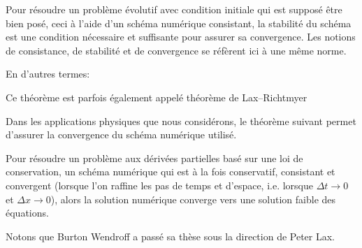 \begin{theoreme}
Pour résoudre un problème évolutif avec condition initiale qui est supposé être bien posé, ceci à l'aide d'un schéma numérique consistant, la stabilité du schéma est une condition nécessaire et suffisante pour assurer sa convergence.
Les notions de consistance, de stabilité et de convergence se réfèrent ici à une même norme.

En d'autres termes: 
\end{theoreme}
Ce théorème est parfois également appelé théorème de Lax–Richtmyer

\medskip
Dans les applications physiques que nous considérons, le théorème suivant permet d'assurer la convergence du schéma numérique utilisé.
\begin{theoreme}
Pour résoudre un problème aux dérivées partielles basé sur une loi de conservation, un schéma numérique qui est à la fois conservatif, consistant et convergent (lorsque l'on raffine les pas de temps et d'espace, i.e. lorsque $\Delta t \rightarrow 0$ et $\Delta x \rightarrow 0$), alors la solution numérique converge vers une solution faible des équations.
\end{theoreme}

Notons que Burton Wendroff a passé sa thèse sous la direction de Peter Lax.

